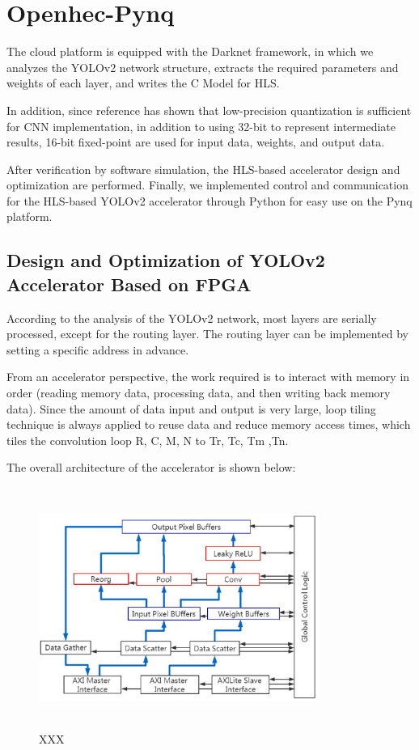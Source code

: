 \section{Openhec-Pynq}
The cloud platform is equipped with the Darknet framework, in which we analyzes the YOLOv2 network structure, extracts the required parameters and weights of each layer, and writes the C Model for HLS.

In addition, since reference \cite{qiu2016going, shan2016dynamic} has shown that low-precision quantization is sufficient for CNN implementation, in addition to using 32-bit to represent intermediate results, 16-bit fixed-point are used for input data, weights, and output data.

After verification by software simulation, the HLS-based accelerator design and optimization are performed. Finally, we implemented control and communication for the HLS-based YOLOv2 accelerator through Python for easy use on the Pynq platform.

\subsection{Design and Optimization of YOLOv2 Accelerator Based on FPGA}
According to the analysis of the YOLOv2 network, most layers are serially processed, except for the routing layer. The routing layer can be implemented by setting a specific address in advance. 

From an accelerator perspective, the work required is to interact with memory in order (reading memory data, processing data, and then writing back memory data). Since the amount of data input and output is very large, loop tiling technique is always applied to reuse data and reduce memory access times, which tiles the convolution loop R, C, M, N to Tr, Tc, Tm ,Tn\cite{zhang2015optimizing}.

The overall architecture of the accelerator is shown below:

\begin{figure}
\includegraphics[height=3.1in, width=3.6in]{figure_2}
\caption{XXX}
\end{figure}


